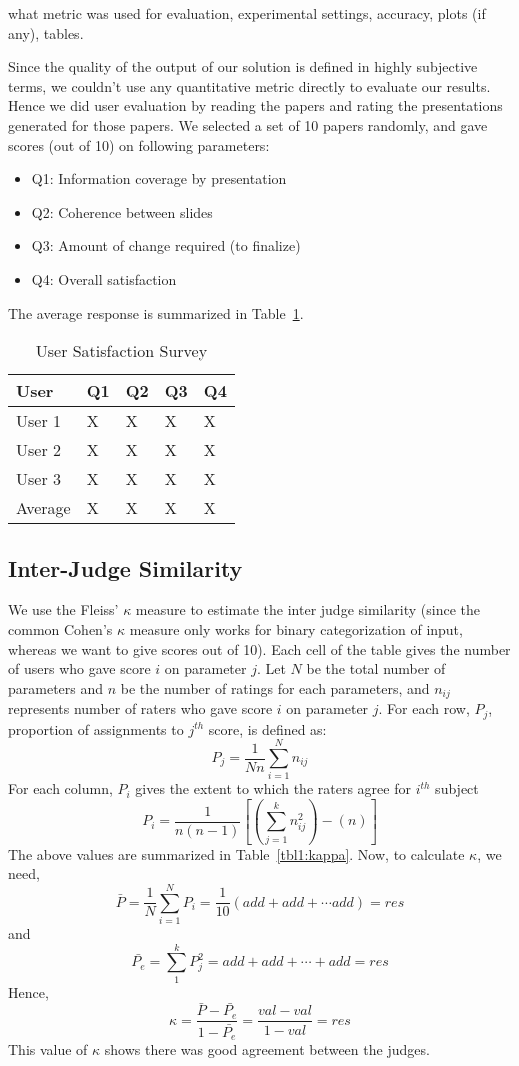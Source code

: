 what metric was used for evaluation, experimental settings, accuracy, plots (if any), tables.

Since the quality of the output of our solution is defined
in highly subjective terms, we couldn't use any quantitative metric
directly to evaluate our results. Hence we did user evaluation by reading
the papers and rating the presentations generated for those papers.
We selected a set of 10 papers randomly, and gave scores (out of 10) on following 
parameters:
\begin{itemize}
	\item Q1: Information coverage by presentation
	\item Q2: Coherence between slides
	\item Q3: Amount of change required (to finalize)
	\item Q4: Overall satisfaction
\end{itemize}
The average response is summarized in Table~\ref{tbl1:users}.

\begin{table}
\begin{center}
\caption{User Satisfaction Survey}
\begin{tabular}{| l | l | l | l | l |}
\hline
User & Q1 & Q2 & Q3 & Q4 \\ \hline
User 1 & X & X & X & X \\ 
User 2 & X & X & X & X \\ 
User 3 & X & X & X & X \\ \hline
Average & X & X & X & X \\ \hline
\end{tabular}
\label{tbl1:users}
\end{center}
\end{table}	


\subsection{Inter-Judge Similarity}
We use the Fleiss' $\kappa$ measure to estimate the inter judge similarity
(since the common Cohen's $\kappa$ measure only works for binary categorization
of input, whereas we want to give scores out of 10).
Each cell of the table gives the number of users who gave score $i$ on 
parameter $j$. Let $N$ be the total number of parameters
and $n$ be the number of ratings for each parameters, and $n_{ij}$
represents number of raters who gave score $i$ on parameter $j$.
For each row, $P_j$, proportion of assignments to $j^{th}$ score, is defined as:
\[
	P_j = \frac{1}{Nn} \sum_{i=1}^{N} n_{ij}
\]
For each column, $P_i$ gives the extent to which the raters agree for $i^{th}$ subject
\[
	P_i = \frac{1}{n(n-1)} \left[ \left( \sum_{j=1}^{k} n_{ij}^{2} \right) - \left( n \right) \right]
\]
The above values are summarized in Table~\ref{tbl1:kappa}.
Now, to calculate $\kappa$, we need,
\[
	\bar{P} = \frac{1}{N} \sum_{i=1}^{N} P_i = \frac{1}{10} \left( add + add + \cdots add \right) = res
\]
and
\[
	\bar{P_e} = \sum_{1}^{k} P_j^2 = add + add + \cdots + add = res	
\]
Hence, 
\[
	\kappa = \frac {\bar{P} - \bar{P_e}} {1 - \bar{P_e}} = \frac{val - val}{1 - val} = res
\]
This value of $\kappa$ shows there was good agreement between the judges.

